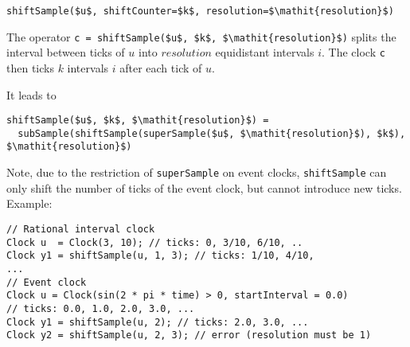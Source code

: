 \begin{operatordefinition}[shiftSample]
\begin{synopsis}\begin{lstlisting}
shiftSample($u$, shiftCounter=$k$, resolution=$\mathit{resolution}$)
\end{lstlisting}\end{synopsis}
\begin{semantics}
The operator \lstinline!c = shiftSample($u$, $k$, $\mathit{resolution}$)! splits the interval between ticks of $u$ into $\mathit{resolution}$ equidistant intervals $i$.  The clock \lstinline!c! then ticks $k$ intervals $i$ after each tick of $u$.

It leads to
\begin{lstlisting}[language=modelica]
shiftSample($u$, $k$, $\mathit{resolution}$) =
  subSample(shiftSample(superSample($u$, $\mathit{resolution}$), $k$), $\mathit{resolution}$)
\end{lstlisting}

\begin{nonnormative}
Note, due to the restriction of \lstinline!superSample! on event clocks, \lstinline!shiftSample! can only shift the number of ticks of the event clock, but cannot introduce new ticks.  Example:
\begin{lstlisting}[language=modelica]
// Rational interval clock
Clock u  = Clock(3, 10); // ticks: 0, 3/10, 6/10, ..
Clock y1 = shiftSample(u, 1, 3); // ticks: 1/10, 4/10,
...
// Event clock
Clock u = Clock(sin(2 * pi * time) > 0, startInterval = 0.0)
// ticks: 0.0, 1.0, 2.0, 3.0, ...
Clock y1 = shiftSample(u, 2); // ticks: 2.0, 3.0, ...
Clock y2 = shiftSample(u, 2, 3); // error (resolution must be 1)
\end{lstlisting}
\end{nonnormative}
\end{semantics}
\end{operatordefinition}

